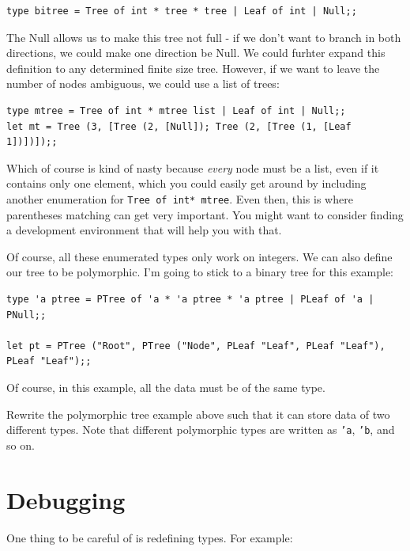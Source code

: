 \documentclass[10pt]{book}
\begin{document}
{\beforeverb
\begin{verbatim}
type bitree = Tree of int * tree * tree | Leaf of int | Null;;
\end{verbatim}
\afterverb

The Null allows us to make this tree not full - if we don't want to branch in both directions, we could make one direction be Null. We could furhter expand this definition to any determined finite size tree. However, if we want to leave the number of nodes ambiguous, we could use a list of trees:

\beforeverb
\begin{verbatim}
type mtree = Tree of int * mtree list | Leaf of int | Null;;
let mt = Tree (3, [Tree (2, [Null]); Tree (2, [Tree (1, [Leaf 1])])]);;
\end{verbatim}
\afterverb

Which of course is kind of nasty because {\it every} node must be a list, even if it contains only one element, which you could easily get around by including another enumeration for {\tt Tree of int* mtree}. Even then, this is where parentheses matching can get very important. You might want to consider finding a development environment that will help you with that.

Of course, all these enumerated types only work on integers. We can also define our tree to be polymorphic. I'm going to stick to a binary tree for this example:

\beforeverb
\begin{verbatim}
type 'a ptree = PTree of 'a * 'a ptree * 'a ptree | PLeaf of 'a | PNull;;

let pt = PTree ("Root", PTree ("Node", PLeaf "Leaf", PLeaf "Leaf"), PLeaf "Leaf");;
\end{verbatim}
\afterverb

Of course, in this example, all the data must be of the same type.

\begin{ex}
Rewrite the polymorphic tree example above such that it can store data of two different types. Note that different polymorphic types are written as {\tt 'a}, {\tt 'b}, and so on. 
\end{ex}


\section{Debugging}



One thing to be careful of is redefining types. For example:

}
\end{document}
